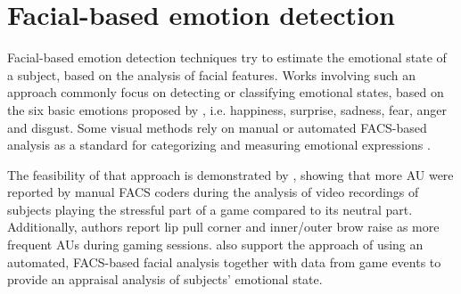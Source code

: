 

\section{Facial-based emotion detection}
\label{ch:literature-face-emotion-detection}

Facial-based emotion detection techniques try to estimate the emotional state of a subject, based on the analysis of facial features. Works involving such an approach commonly focus on detecting or classifying emotional states, based on the six basic emotions proposed by \textcite{ekman1971constants}, i.e. happiness, surprise, sadness, fear, anger and disgust. Some visual methods rely on manual or automated FACS-based analysis as a standard for categorizing and measuring emotional expressions \parencite{bartlett1999measuring}.

The feasibility of that approach is demonstrated by \textcite{kaiser1994multi}, showing that more AU were reported by manual FACS coders during the analysis of video recordings of subjects playing the stressful part of a game compared to its neutral part. Additionally, authors report lip pull corner and inner/outer brow raise as more frequent AUs during gaming sessions. \textcite{wehrle2000emotion} also support the approach of using an automated, FACS-based facial analysis together with data from game events to provide an appraisal analysis of subjects' emotional state.

